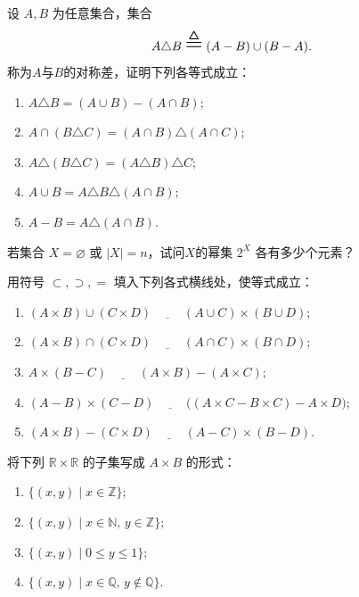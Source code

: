 \begin{exercise}
	\item 设 \(A,B\) 为任意集合，集合
	\[
	A \triangle B\mathrel{\scalebox{1.8}{$\triangleq$}}(A-B)\cup(B-A).
	\]
	称为$A$与$B$的对称差，证明下列各等式成立：
	\begin{enumerate}[label=\arabic*)]
		\item \(A\triangle B=(A\cup B)-(A\cap B);\)
		\item \(A\cap(B\triangle C)=(A\cap B)\triangle(A\cap C);\)
		\item \(A\triangle(B\triangle C)=(A\triangle B)\triangle C;\)
		\item \(A\cup B=A\triangle B\triangle(A\cap B);\)
		\item \(A-B=A\triangle(A\cap B).\)
	\end{enumerate}
\end{exercise}

\begin{exercise}
	\item 若集合 \(X=\varnothing\) 或 \(|X|=n\)，试问$X$的幂集 \(2^X\) 各有多少个元素？
\end{exercise}

\begin{exercise}
	\item 用符号 \(\subset,\supset,=\) 填入下列各式横线处，使等式成立：
	\begin{enumerate}[label=\arabic*)]
		\item \((A \times B) \cup (C \times D)\;\underline{\qquad}\;
		(A \cup C) \times (B \cup D);\)
		\item \((A \times B) \cap (C \times D)\;\underline{\qquad}\;
		(A \cap C) \times (B \cap D);\)
		\item \(A\times(B-C)\;\underline{\qquad}\;
		(A\times B)-(A\times C);\)
		\item \((A-B)\times(C-D)\;\underline{\qquad}\;
		\bigl((A\times C-B\times C)-A\times D\bigr);\)
		\item \((A\times B)-(C\times D)\;\underline{\qquad}\;
		(A-C)\times(B-D).\)
	\end{enumerate}
\end{exercise}

\begin{exercise}
	\item 将下列 \(\mathbb{R}\times\mathbb{R}\) 的子集写成 \(A\times B\) 的形式：
	\begin{enumerate}[label=\arabic*)]
		\item \(\{(x,y)\mid x\in\mathbb{Z}\};\)
		\item \(\{(x,y)\mid x\in\mathbb{N},\,y\in\mathbb{Z}\};\)
		\item \(\{(x,y)\mid 0\le y\le 1\};\)
		\item \(\{(x,y)\mid x\in\mathbb{Q},\,y\notin\mathbb{Q}\}.\)
	\end{enumerate}
\end{exercise}

